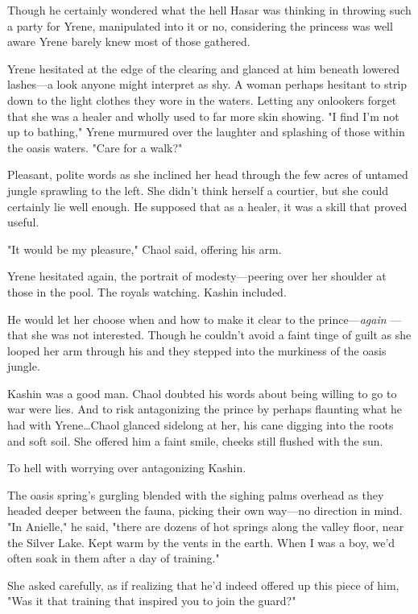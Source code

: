 Though he certainly wondered what the hell Hasar was thinking in throwing such a party for Yrene, manipulated into it or no, considering the princess was well aware Yrene barely knew most of those gathered.

Yrene hesitated at the edge of the clearing and glanced at him beneath lowered lashes---a look anyone might interpret as shy.
A woman perhaps hesitant to strip down to the light clothes they wore in the waters.
Letting any onlookers forget that she was a healer and wholly used to far more skin showing.
"I find I'm not up to bathing," Yrene murmured over the laughter and splashing of those within the oasis waters.
"Care for a walk?"

Pleasant, polite words as she inclined her head through the few acres of untamed jungle sprawling to the left.
She didn't think herself a courtier, but she could certainly lie well enough.
He supposed that as a healer, it was a skill that proved useful.

"It would be my pleasure," Chaol said, offering his arm.

Yrene hesitated again, the portrait of modesty---peering over her shoulder at those in the pool.
The royals watching.
Kashin included.

He would let her choose when and how to make it clear to the prince---\emph{again} ---that she was not interested.
Though he couldn't avoid a faint tinge of guilt as she looped her arm through his and they stepped into the murkiness of the oasis jungle.

Kashin was a good man.
Chaol doubted his words about being willing to go to war were lies.
And to risk antagonizing the prince by perhaps flaunting what he had with Yrene\ldots Chaol glanced sidelong at her, his cane digging into the roots and soft soil.
She offered him a faint smile, cheeks still flushed with the sun.

To hell with worrying over antagonizing Kashin.

The oasis spring's gurgling blended with the sighing palms overhead as they headed deeper between the fauna, picking their own way---no direction in mind.
"In Anielle," he said, "there are dozens of hot springs along the valley floor, near the Silver Lake.
Kept warm by the vents in the earth.
When I was a boy, we'd often soak in them after a day of training."

She asked carefully, as if realizing that he'd indeed offered up this piece of him, "Was it that training that inspired you to join the guard?"

